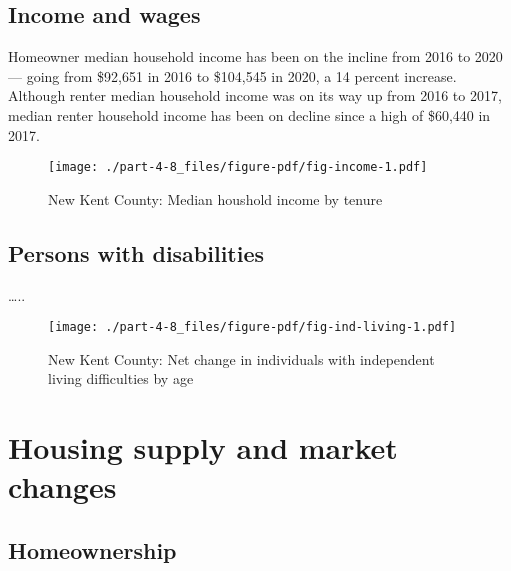 \documentclass[
  letterpaper,
  DIV=11,
  numbers=noendperiod]{scrreprt}
\begin{document}
\hypertarget{income-and-wages-7}{%
\subsection{Income and wages}\label{income-and-wages-7}}

Homeowner median household income has been on the incline from 2016 to
2020 --- going from \$92,651 in 2016 to \$104,545 in 2020, a 14 percent
increase. Although renter median household income was on its way up from
2016 to 2017, median renter household income has been on decline since a
high of \$60,440 in 2017.

\begin{figure}

{\centering \texttt{[image: ./part-4-8\_files/figure-pdf/fig-income-1.pdf]}

}

\caption{\label{fig-income}New Kent County: Median houshold income by
tenure}

\end{figure}

\hypertarget{persons-with-disabilities-6}{%
\subsection{Persons with
disabilities}\label{persons-with-disabilities-6}}

\ldots..

\begin{figure}

{\centering \texttt{[image: ./part-4-8\_files/figure-pdf/fig-ind-living-1.pdf]}

}

\caption{\label{fig-ind-living}New Kent County: Net change in
individuals with independent living difficulties by age}

\end{figure}

\hypertarget{housing-supply-and-market-changes-7}{%
\section{Housing supply and market
changes}\label{housing-supply-and-market-changes-7}}

\hypertarget{homeownership-7}{%
\subsection{Homeownership}\label{homeownership-7}}
\end{document}

